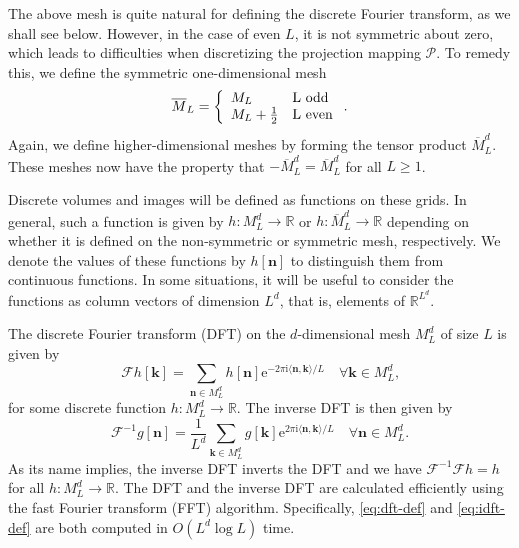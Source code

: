 \documentclass{article}
\newcommand{\euler}{\mathrm{e}}
\newcommand{\imunit}{\mathrm{i}}
\newcommand{\Real}{\mathbb R}
\newcommand{\meshu}{M}
\newcommand{\meshc}{\overline{M}}
\newcommand{\projfun}{\mathcal{P}}
\newcommand{\vn}{\boldsymbol{n}}
\newcommand{\vk}{\boldsymbol{k}}
\newcommand{\fourier}[1]{\mathcal{F}#1}
\newcommand{\ifourier}[1]{\mathcal{F}^{-1}#1}
\begin{document}
The above mesh is quite natural for defining the discrete Fourier transform, as we shall see below.
However, in the case of even $L$, it is not symmetric about zero, which leads to difficulties when discretizing the projection mapping $\projfun$.
To remedy this, we define the symmetric one-dimensional mesh
\begin{equation}
	\meshc_L =
	\left\{
	\begin{array}{ll}
		\meshu_L & $L$ \mbox{~odd} \\
		\meshu_L + \frac{1}{2} & $L$ \mbox{~even}
	\end{array}
	\right.
	\mbox{.}
\end{equation}
Again, we define higher-dimensional meshes by forming the tensor product $\meshc_L^d$.
These meshes now have the property that $-\meshc_L^d = \meshc_L^d$ for all $L \ge 1$.

Discrete volumes and images will be defined as functions on these grids.
In general, such a function is given by $h: \meshu_L^d \rightarrow \Real$ or $h: \meshc_L^d \rightarrow \Real$ depending on whether it is defined on the non-symmetric or symmetric mesh, respectively.
We denote the values of these functions by $h[\vn]$ to distinguish them from continuous functions.
In some situations, it will be useful to consider the functions as column vectors of dimension $L^d$, that is, elements of $\Real^{L^d}$.

The discrete Fourier transform (DFT) on the $d$-dimensional mesh $\meshu_L^d$ of size $L$ is given by
\begin{equation}
	\label{eq:dft-def}
	\fourier{h}[\vk] = \sum_{\vn \in \meshu_L^d} h[\vn] \euler^{-2\pi\imunit \langle \vn, \vk \rangle / L} \quad \forall \vk \in \meshu_L^d \mbox{,}
\end{equation}
for some discrete function $h: \meshu_L^d \rightarrow \Real$.
The inverse DFT is then given by
\begin{equation}
	\label{eq:idft-def}
	\ifourier{g}[\vn] = \frac{1}{L^d} \sum_{\vk \in \meshu_L^d} g[\vk] \euler^{2\pi\imunit \langle \vn, \vk \rangle / L} \quad \forall \vn \in \meshu_L^d \mbox{.}
\end{equation}
As its name implies, the inverse DFT inverts the DFT and we have $\ifourier{\fourier{h}} = h$ for all $h: \meshu_L^d \rightarrow \Real$.
The DFT and the inverse DFT are calculated efficiently using the fast Fourier transform (FFT) algorithm.
Specifically, \eqref{eq:dft-def} and \eqref{eq:idft-def} are both computed in $O(L^d \log L)$ time.
\end{document}
